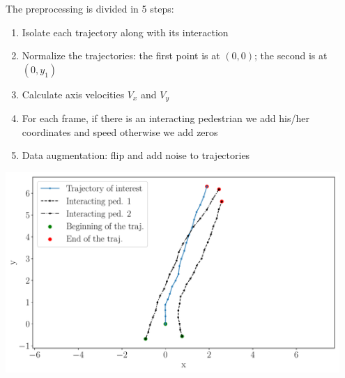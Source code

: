 \documentclass[a0,portrait]{a0poster}
\begin{document}
\begin{multicols}{2}
\begin{minipage}[]{0.5\linewidth}
The preprocessing is divided in 5 steps:
\begin{enumerate}
\item Isolate each trajectory along with its interaction
\item Normalize the trajectories: the first point is at $(0,0)$; the second is at $(0,y_1)$
\item Calculate axis velocities $V_x$ and $V_y$
\item For each frame, if there is an interacting pedestrian we add his/her coordinates and speed otherwise we add zeros
\item Data augmentation: flip and add noise to trajectories
\end{enumerate}
\end{minipage}
\hfill
\begin{minipage}[]{0.5\linewidth}
\begin{center}
\centerline {\includegraphics[width=0.95\textwidth]{figure/afterrot}} 
\end{center}
\end{minipage}

\vspace{1cm}


\end{multicols}
\end{document}
